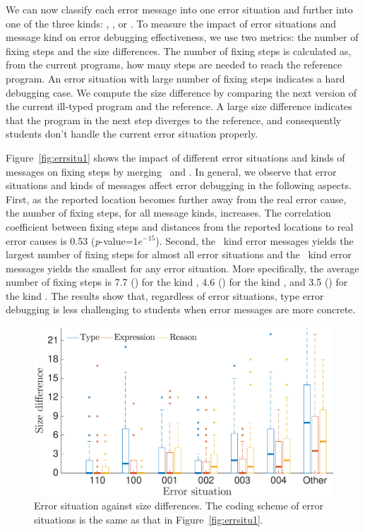 \documentclass[12pt]{report}	%
\begin{document}
We can now classify each error message into one error situation
and further into one of the three kinds:
\typet, \typer, or \typee.
%
To measure the impact of error situations and message kind on
error debugging effectiveness, 
we use two metrics: the number of fixing steps and the size differences.
The number of fixing steps is calculated as, from the current programs,
how many steps are needed to reach the reference program.
%
An error situation with large number of fixing steps
indicates a hard debugging case.
%
We compute the size difference by comparing the next version of the current ill-typed program
and the reference.
A large size difference indicates that 
the program in the next step diverges to the reference,
and consequently students don't handle
the current error situation properly.

Figure~\ref{fig:errsitu1} shows the impact of 
different error situations and kinds of 
messages on fixing steps by merging \benchf\ 
and \benchs.
%
In general, we observe that
error situations and kinds of messages affect 
error debugging in the following aspects. First, 
as the reported location becomes further away from 
the real error cause, the number of fixing steps, 
for all message kinds, increases. 
%
The correlation coefficient between fixing steps and 
distances from the reported locations to real error causes
is 0.53 (\emph{p}-value=$1e^{-15}$). 
%
Second, 
%
the \typet\ kind error messages yields the largest
number of fixing steps for almost all error situations and
%
the \typee\ kind error messages yields the smallest
for any error situation.
%
%
More specifically, the average number of fixing steps
is 7.7 () for the kind \typet, 
4.6 () for the kind \typer, 
and 3.5 () for the kind \typee.
%
The results show that, regardless of error situations,
type error debugging is less challenging to students when
error messages are more concrete. 

\begin{figure}
\centering
\includegraphics[width=0.85\columnwidth]{images/size_test.eps}
\caption[Error situation against size differences]{Error situation against size differences. The coding
scheme of error situations is the same as that 
in Figure~\ref{fig:errsitu1}.}
\label{fig:errsitu2}
\end{figure}
\end{document}
